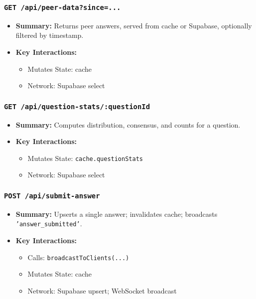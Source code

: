 \documentclass[11pt,letterpaper]{article}
\begin{document}
\subsubsection{\texttt{GET /api/peer-data?since=...}}
\begin{itemize}
    \item \textbf{Summary:} Returns peer answers, served from cache or Supabase, optionally filtered by timestamp.
    \item \textbf{Key Interactions:}
    \begin{itemize}
        \item Mutates State: cache
        \item Network: Supabase select
    \end{itemize}
\end{itemize}

\subsubsection{\texttt{GET /api/question-stats/:questionId}}
\begin{itemize}
    \item \textbf{Summary:} Computes distribution, consensus, and counts for a question.
    \item \textbf{Key Interactions:}
    \begin{itemize}
        \item Mutates State: \texttt{cache.questionStats}
        \item Network: Supabase select
    \end{itemize}
\end{itemize}

\subsubsection{\texttt{POST /api/submit-answer}}
\begin{itemize}
    \item \textbf{Summary:} Upserts a single answer; invalidates cache; broadcasts \texttt{'answer\_submitted'}.
    \item \textbf{Key Interactions:}
    \begin{itemize}
        \item Calls: \texttt{broadcastToClients(...)}
        \item Mutates State: cache
        \item Network: Supabase upsert; WebSocket broadcast
    \end{itemize}
\end{itemize}
\end{document}

